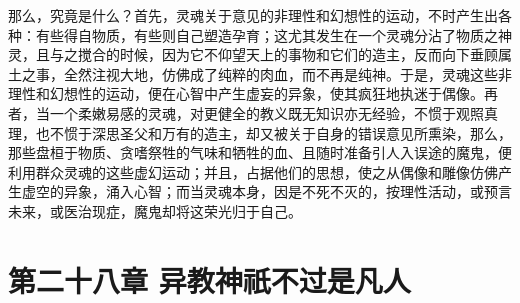 那么，究竟是什么？首先，灵魂关于意见的非理性和幻想性的运动，不时产生出各种：有些得自物质，有些则自己塑造孕育；这尤其发生在一个灵魂分沾了物质之神灵，且与之搅合的时候，因为它不仰望天上的事物和它们的造主，反而向下垂顾属土之事，全然注视大地，仿佛成了纯粹的肉血，而不再是纯神。于是，灵魂这些非理性和幻想性的运动，便在心智中产生虚妄的异象，使其疯狂地执迷于偶像。再者，当一个柔嫩易感的灵魂，对更健全的教义既无知识亦无经验，不惯于观照真理，也不惯于深思圣父和万有的造主，却又被关于自身的错误意见所熏染，那么，那些盘桓于物质、贪嗜祭牲的气味和牺牲的血、且随时准备引人入误途的魔鬼，便利用群众灵魂的这些虚幻运动；并且，占据他们的思想，使之从偶像和雕像仿佛产生虚空的异象，涌入心智；而当灵魂本身，因是不死不灭的，按理性活动，或预言未来，或医治现症，魔鬼却将这荣光归于自己。\par


\section{第二十八章 异教神祇不过是凡人}

